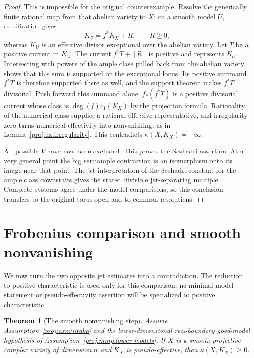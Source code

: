 \documentclass[11pt,letterpaper]{article}
\newtheorem{theorem}{Theorem}[section]
\theoremstyle{definition}
\theoremstyle{remark}
\begin{document}
\begin{proof}
This is impossible for the original counterexample.  Resolve the
generically finite rational map from that abelian variety to \(X\):
on a smooth model \(U\), ramification gives
\[
 K_U=f^*K_X+R,\qquad R\ge0,
\]
whereas \(K_U\) is an effective divisor exceptional over the
abelian variety.  Let \(T\) be a positive current in \(K_X\).
The current \(f^*T+[R]\) is positive and represents \(K_U\).
Intersecting with powers of the ample class pulled back from the
abelian variety shows that this sum is supported on the exceptional
locus.  Its positive summand \(f^*T\) is therefore supported there
as well, and the support theorem makes \(f^*T\) divisorial.
Push forward this summand alone: \(f_*(f^*T)\) is a positive
divisorial current whose class is \(\deg(f)c_1(K_X)\) by the
projection formula.  Rationality of the numerical class supplies
a rational effective representative, and irregularity zero turns
numerical effectivity into nonvanishing, as in
Lemma~\ref{proj:ex:irregularity}.  This contradicts
\(\kappa(X,K_X)=-\infty\).

All possible \(V\) have now been excluded.  This proves the
Seshadri assertion.  At a very general point the big semiample
contraction is an isomorphism onto its image near that point.
The jet interpretation of the Seshadri constant for the ample
class downstairs gives the stated divisible jet-separating
multiple.  Complete systems agree under the model comparisons,
so this conclusion transfers to the original torus open and to
common resolutions.
\end{proof}

\section{Frobenius comparison and smooth nonvanishing}
\label{proj:fr:section}

We now turn the two opposite jet estimates into a contradiction.
The reduction to positive characteristic is used only for this comparison:
no minimal-model statement or pseudo-effectivity assertion will be
specialized to positive characteristic.

\begin{theorem}[The smooth nonvanishing step]
\label{proj:thm:smooth-nonvanishing}
Assume Assumption~\ref{proj:asm:iitaka} and the lower-dimensional
real-boundary good-model hypothesis of Assumption~\ref{proj:mmp:lower-models}.
If \(X\) is a smooth projective complex variety of dimension \(n\) and
\(K_X\) is pseudo-effective, then \(\kappa(X,K_X)\geq0\).
\end{theorem}
\end{document}
